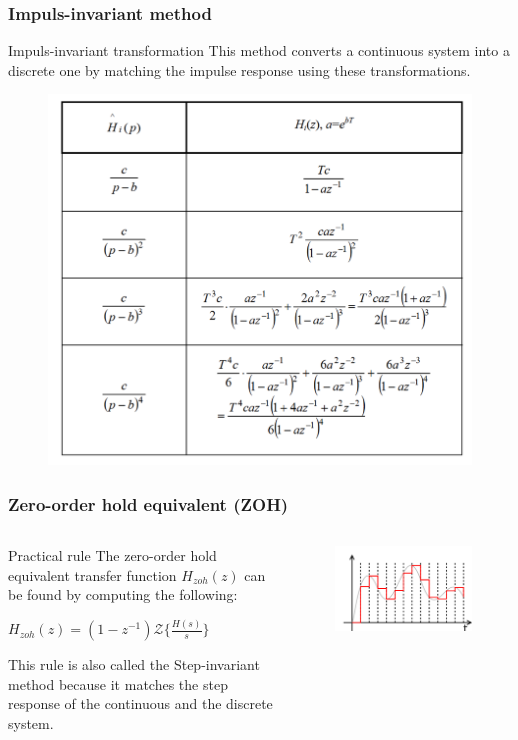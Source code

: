 \begin{frame}
	\frametitle{Impuls-invariant method}
	\begin{block}{Impuls-invariant transformation}
		This method converts a continuous system into a discrete one by matching the impulse response using these transformations.
		\vspace{-1em}
		\begin{figure}
			\centering
			\includegraphics[width=0.5\linewidth]{impuls_inv}
		\end{figure}
	\end{block}
\end{frame}

\begin{frame}
	\frametitle{Zero-order hold equivalent (ZOH)}
\begin{columns}
	\begin{column}{0.5\textwidth}
	\begin{block}{Practical rule}
		The zero-order hold equivalent transfer function $H_{zoh}(z)$ can be found by computing the following:
		\begin{center}
			$H_{zoh}(z) = (1 - z^{-1}) \mathcal{Z}\{\frac{H(s)}{s}\}$
		\end{center}
		This rule is also called the Step-invariant method because it matches the step response of the continuous and the discrete system.
	\end{block}
	\end{column}
	
	\begin{column}{0.5\textwidth}
		\begin{figure}
			\centering
			\includegraphics[width=1\linewidth]{zero-order}
		\end{figure}
	\end{column}
\end{columns}
\end{frame}

